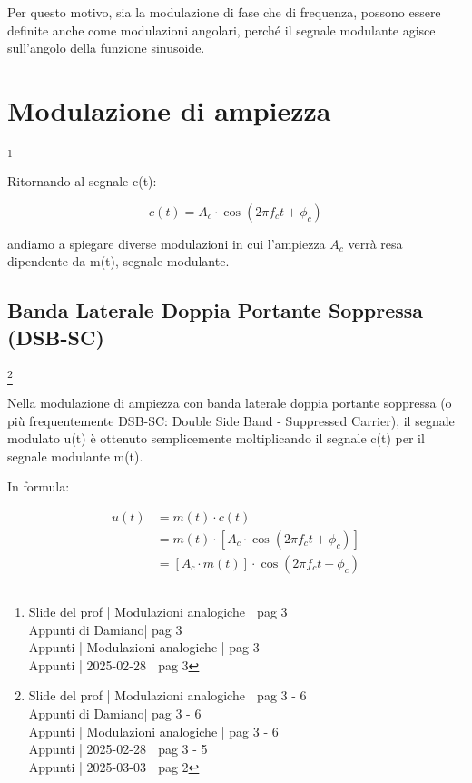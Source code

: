 Per questo motivo, sia la modulazione di fase che di frequenza, possono essere definite anche come modulazioni angolari, 
perché il segnale modulante agisce sull'angolo della funzione sinusoide. \newline 

\newpage 

\section{Modulazione di ampiezza}
\footnote{Slide del prof | Modulazioni analogiche | pag 3 \\  
Appunti di Damiano| pag 3 \\
Appunti | Modulazioni analogiche | pag 3 \\
Appunti | 2025-02-28 | pag 3
} 

Ritornando al segnale c(t): 

{
    \Large 
    \begin{equation}
        c(t) = A_c \cdot \cos(2 \pi f_c t + \phi_c)
    \end{equation}
}

andiamo a spiegare diverse modulazioni in cui l'ampiezza $A_c$ verrà resa dipendente da m(t), segnale modulante. \newline 

\newpage 

\subsection{Banda Laterale Doppia Portante Soppressa (DSB-SC)}
\footnote{Slide del prof | Modulazioni analogiche | pag 3 - 6\\  
Appunti di Damiano| pag 3 - 6\\
Appunti | Modulazioni analogiche | pag 3 - 6 \\
Appunti | 2025-02-28 | pag 3 - 5 \\
Appunti | 2025-03-03 | pag 2
} 

Nella modulazione di ampiezza con banda laterale doppia portante soppressa (o più frequentemente DSB-SC: Double Side Band - Suppressed Carrier), 
il segnale modulato u(t) è ottenuto semplicemente moltiplicando il segnale c(t) per il segnale modulante m(t). \newline 

In formula: 

{
    \Large 
    \begin{equation}
        \begin{split}
            u (t) 
            &= 
            m(t) \cdot c(t)
            \\
            &=
            m(t) \cdot \left[ A_c \cdot \cos(2 \pi f_c t + \phi_c) \right]
            \\
            &= 
            \left[A_c \cdot m(t) \right] \cdot \cos(2 \pi f_c t + \phi_c)
        \end{split}
    \end{equation}
}

